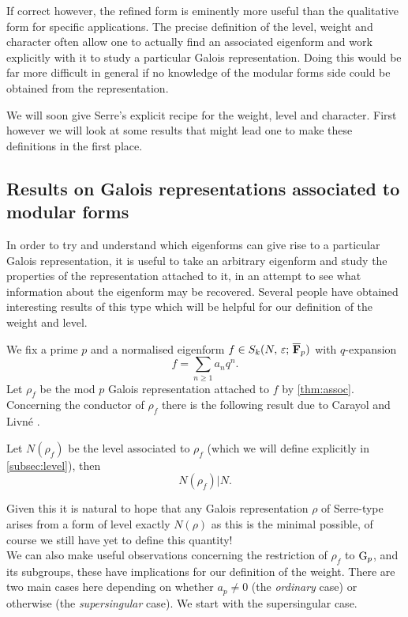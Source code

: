 \documentclass[a4paper,12pt]{article}
\begin{document}
If correct however, the refined form is eminently more useful than the qualitative form for specific applications.
The precise definition of the level, weight and character often allow one to actually find an associated eigenform and work explicitly with it to study a particular Galois representation.
Doing this would be far more difficult in general if no knowledge of the modular forms side could be obtained from the representation.

We will soon give Serre's explicit recipe for the weight, level and character.
First however we will look at some results that might lead one to make these definitions in the first place.

\subsection{Results on Galois representations associated to modular forms}\label{sec:galassoc}
In order to try and understand which eigenforms can give rise to a particular Galois representation, it is useful to take an arbitrary eigenform and study the properties of the representation attached to it, in an attempt to see what information about the eigenform may be recovered.
Several people have obtained interesting results of this type which will be helpful for our definition of the weight and level.

We fix a prime $p$ and a normalised eigenform $f \in S_k(N,\,\varepsilon;\,\overline{\mathbf{F}}_p)$ with $q$-expansion
\[
f = \sum_{n\ge 1} a_nq^n.
\]
Let $\rho_f$ be the mod $p$ Galois representation attached to $f$ by \cref{thm:assoc}.
Concerning the conductor of $\rho_f$ there is the following result due to Carayol and Livn\'e \cite{Carayol, Livne}.

\begin{thm}\label{thm:level}
Let $N(\rho_f)$ be the level associated to $\rho_f$ (which we will define explicitly in \cref{subsec:level}), then
\[
N(\rho_f)|N.
\]
\end{thm}

Given this it is natural to hope that any Galois representation $\rho$ of Serre-type arises from a form of level exactly $N(\rho)$ as this is the minimal possible, of course we still have yet to define this quantity!
\\[12pt] \noindent
We can also make useful observations concerning the restriction of $\rho_f$ to $\mathrm{G}_p$, and its subgroups, these have implications for our definition of the weight.
There are two main cases here depending on whether $a_p \ne 0$ (the \emph{ordinary} case) or otherwise (the \emph{supersingular} case).
We start with the supersingular case.
\end{document}
